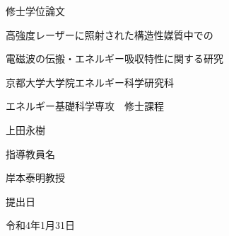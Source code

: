 
\thispagestyle{empty}

\begin{center}
  
  \vspace*{3zw}

  {\LARGE{修士学位論文}}

  \vspace{3zw}

\end{center}

\begin{flushleft}


\end{flushleft}

\begin{center}

  {\huge{{高強度レーザーに照射された構造性媒質中での}}}

  {\huge{{電磁波の伝搬・エネルギー吸収特性に関する研究}}}

  \vspace{3zw}

  \LARGE{京都大学大学院エネルギー科学研究科}

  \LARGE{エネルギー基礎科学専攻　修士課程}

  \vspace{3zw}

  \LARGE{{上田\hspace{1zw}永樹}}

  \vspace{4zw}

  \LARGE{指導教員名}
  
  \Large{岸本\hspace{1zw}泰明\hspace{1zw}教授}



  \vspace{4zw}

  \LARGE{提出日}

  \LARGE{令和4年1月31日}

\end{center}


